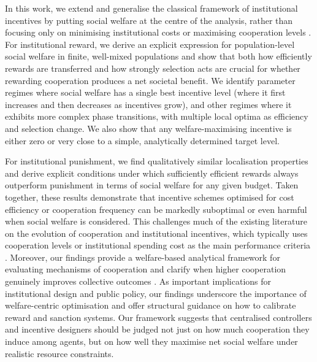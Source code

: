 \documentclass{article}
\begin{document}
In this work, we extend and generalise the classical framework of institutional incentives by putting social welfare at the centre of the analysis, rather than focusing only on minimising institutional costs or maximising cooperation levels \cite{HAN2026_social_welfare,duong2023cost,chen2015first,wang2019exploring}. For institutional reward, we derive an explicit expression for population-level social welfare in finite, well-mixed populations and show that both how efficiently rewards are transferred and how strongly selection acts are crucial for whether rewarding cooperation produces a net societal benefit. We identify parameter regimes where social welfare has a single best incentive level (where it first increases and then decreases as incentives grow), and other regimes where it exhibits more complex phase transitions, with multiple local optima as efficiency and selection change. We also show that any welfare-maximising incentive is either zero or very close to a simple, analytically determined target level. 

For institutional punishment, we find qualitatively similar localisation properties and derive explicit conditions under which sufficiently efficient rewards always outperform punishment in terms of social welfare for any given budget. Taken together, these results demonstrate that incentive schemes optimised for cost efficiency or cooperation frequency can be markedly suboptimal or even harmful when social welfare is considered. This challenges much of the existing literature on the evolution of cooperation and institutional incentives, which typically uses cooperation levels or institutional spending cost as the main performance criteria \cite{hilbe2012emergence,sigmund2001reward,sigmund2010social,cimpeanu2019exogenous,chen2015first,wang2021incentive,sasaki2012take,gois2019reward,duong2023cost,garcia2019evolution,wu2017probabilistic,liu2026dynamic}. Moreover, our findings provide a welfare-based analytical framework for evaluating mechanisms of cooperation and clarify when higher cooperation genuinely improves collective outcomes \cite{HAN2026_social_welfare}. As important implications for institutional design and public policy, our findings underscore the importance of welfare-centric optimisation and offer structural guidance on how to calibrate reward and sanction systems. Our framework suggests that centralised controllers and incentive designers should be judged not just on how much cooperation they induce among agents, but on how well they maximise net social welfare under realistic resource constraints.
\end{document}
